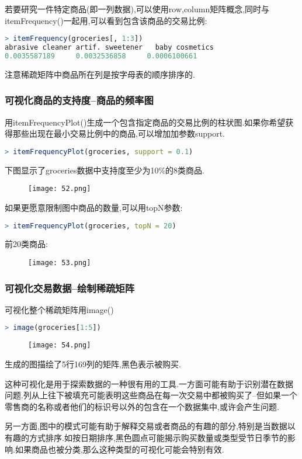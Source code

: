 \documentclass[11pt,a4paper,oneside]{book}
\begin{document}
若要研究一件特定商品(即一列数据),可以使用row,column矩阵概念,同时与itemFrequency()一起用,可以看到包含该商品的交易比例:
\begin{lstlisting}[language=r]
> itemFrequency(groceries[, 1:3])
abrasive cleaner artif. sweetener   baby cosmetics 
0.0035587189     0.0032536858     0.0006100661 
\end{lstlisting}
注意稀疏矩阵中商品所在列是按字母表的顺序排序的.

\subsubsection{可视化商品的支持度--商品的频率图}
用itemFrequencyPlot()生成一个包含指定商品的交易比例的柱状图.如果你希望获得那些出现在最小交易比例中的商品,可以增加加参数support.
\begin{lstlisting}[language=r]
> itemFrequencyPlot(groceries, support = 0.1)
\end{lstlisting}
下图显示了groceries数据中支持度至少为10\%的8类商品.
\begin{figure}[H]
	\centering
	\texttt{[image: 52.png]}
\end{figure}

如果更愿意限制图中商品的数量,可以用topN参数:
\begin{lstlisting}[language=r]
> itemFrequencyPlot(groceries, topN = 20)
\end{lstlisting}
前20类商品:
\begin{figure}[H]
	\centering
	\texttt{[image: 53.png]}
\end{figure}

\subsubsection{可视化交易数据--绘制稀疏矩阵}
可视化整个稀疏矩阵用image()
\begin{lstlisting}[language=r]
> image(groceries[1:5])
\end{lstlisting}
\begin{figure}[H]
	\centering
	\texttt{[image: 54.png]}
\end{figure}
生成的图描绘了5行169列的矩阵,黑色表示被购买.

这种可视化是用于探索数据的一种很有用的工具.一方面可能有助于识别潜在数据问题.列从上往下被填充可能表明这些商品在每一次交易中都被购买了--但如果一个零售商的名称或者他们的标识号以外的包含在一个数据集中,或许会产生问题.

另一方面,图中的模式可能有助于解释交易或者商品的有趣的部分,特别是当数据以有趣的方式排序.如按日期排序,黑色圆点可能揭示购买数量或类型受节日季节的影响.如果商品也被分类,那么这种类型的可视化可能会特别有效.
\end{document}
